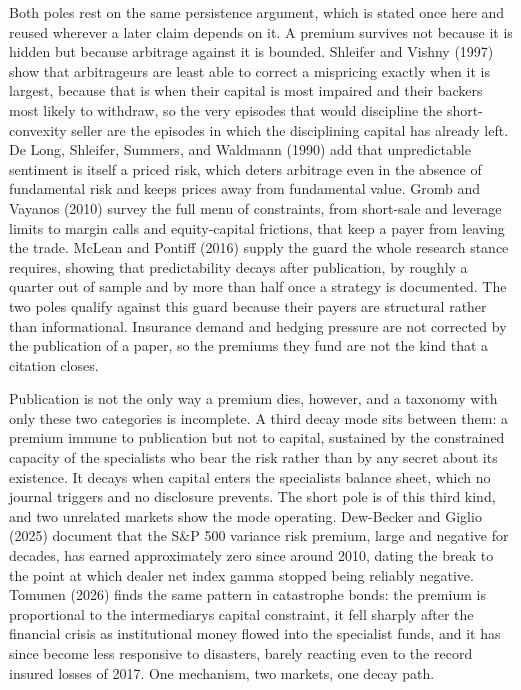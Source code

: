 \documentclass[12pt, a4paper]{article}
\begin{document}
Both poles rest on the same persistence argument, which is stated once
here and reused wherever a later claim depends on it. A premium survives
not because it is hidden but because arbitrage against it is bounded.
Shleifer and Vishny (1997) show that arbitrageurs are least able to
correct a mispricing exactly when it is largest, because that is when
their capital is most impaired and their backers most likely to
withdraw, so the very episodes that would discipline the short-convexity
seller are the episodes in which the disciplining capital has already
left. De Long, Shleifer, Summers, and Waldmann (1990) add that
unpredictable sentiment is itself a priced risk, which deters arbitrage
even in the absence of fundamental risk and keeps prices away from
fundamental value. Gromb and Vayanos (2010) survey the full menu of
constraints, from short-sale and leverage limits to margin calls and
equity-capital frictions, that keep a payer from leaving the trade.
McLean and Pontiff (2016) supply the guard the whole research stance
requires, showing that predictability decays after publication, by
roughly a quarter out of sample and by more than half once a strategy is
documented. The two poles qualify against this guard because their
payers are structural rather than informational. Insurance demand and
hedging pressure are not corrected by the publication of a paper, so the
premiums they fund are not the kind that a citation closes.

Publication is not the only way a premium dies, however, and a taxonomy
with only these two categories is incomplete. A third decay mode sits
between them: a premium immune to publication but not to capital,
sustained by the constrained capacity of the specialists who bear the
risk rather than by any secret about its existence. It decays when
capital enters the specialist\textquotesingle s balance sheet, which no
journal triggers and no disclosure prevents. The short pole is of this
third kind, and two unrelated markets show the mode operating.
Dew-Becker and Giglio (2025) document that the S\&P 500 variance risk
premium, large and negative for decades, has earned approximately zero
since around 2010, dating the break to the point at which dealer net
index gamma stopped being reliably negative. Tomunen (2026) finds the
same pattern in catastrophe bonds: the premium is proportional to the
intermediary\textquotesingle s capital constraint, it fell sharply after
the financial crisis as institutional money flowed into the specialist
funds, and it has since become less responsive to disasters, barely
reacting even to the record insured losses of 2017. One mechanism, two
markets, one decay path.
\end{document}

